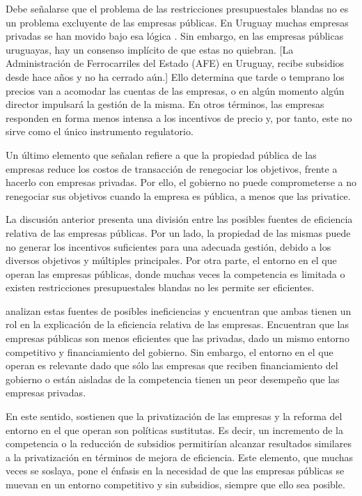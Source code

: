 \documentclass[
  12pt,
  spanish,
]{book}
\begin{document}
Debe señalarse que el problema de las restricciones presupuestales
blandas no es un problema excluyente de las empresas públicas. En
Uruguay muchas empresas privadas se han movido bajo esa lógica
\citep{Vaz1993}. Sin embargo, en las empresas públicas uruguayas, hay un
consenso implícito de que estas no quiebran. {[}La Administración de
Ferrocarriles del Estado (AFE) en Uruguay, recibe subsidios desde hace
años y no ha cerrado aún.{]} Ello determina que tarde o temprano los
precios van a acomodar las cuentas de las empresas, o en algún momento
algún director impulsará la gestión de la misma. En otros términos, las
empresas responden en forma menos intensa a los incentivos de precio y,
por tanto, este no sirve como el único instrumento regulatorio.

Un último elemento que señalan \citet{Sappington1987} refiere a que la
propiedad pública de las empresas reduce los costos de transacción de
renegociar los objetivos, frente a hacerlo con empresas privadas. Por
ello, el gobierno no puede comprometerse a no renegociar sus objetivos
cuando la empresa es pública, a menos que las privatice.

La discusión anterior presenta una división entre las posibles fuentes
de eficiencia relativa de las empresas públicas. Por un lado, la
propiedad de las mismas puede no generar los incentivos suficientes para
una adecuada gestión, debido a los diversos objetivos y múltiples
principales. Por otra parte, el entorno en el que operan las empresas
públicas, donde muchas veces la competencia es limitada o existen
restricciones presupuestales blandas no les permite ser eficientes.

\citet{Bartel2005} analizan estas fuentes de posibles ineficiencias y
encuentran que ambas tienen un rol en la explicación de la eficiencia
relativa de las empresas. Encuentran que las empresas públicas son menos
eficientes que las privadas, dado un mismo entorno competitivo y
financiamiento del gobierno. Sin embargo, el entorno en el que operan es
relevante dado que sólo las empresas que reciben financiamiento del
gobierno o están aisladas de la competencia tienen un peor desempeño que
las empresas privadas.

En este sentido, sostienen que la privatización de las empresas y la
reforma del entorno en el que operan son políticas sustitutas. Es decir,
un incremento de la competencia o la reducción de subsidios permitirían
alcanzar resultados similares a la privatización en términos de mejora
de eficiencia. Este elemento, que muchas veces se soslaya, pone el
énfasis en la necesidad de que las empresas públicas se muevan en un
entorno competitivo y sin subsidios, siempre que ello sea posible.
\end{document}

